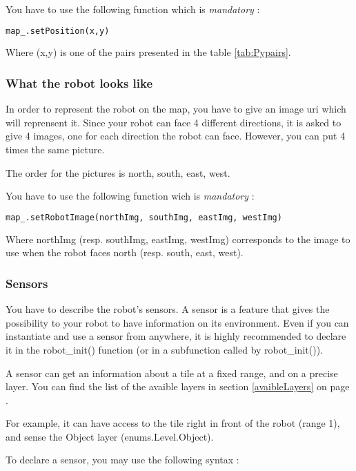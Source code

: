 \documentclass[a4paper,11pt]{article}
\begin{document}
You have to use the following function which is \emph{mandatory} :

\begin{lstlisting}[language=Python]
map_.setPosition(x,y)
\end{lstlisting}

Where (x,y) is one of the pairs presented in the table \ref{tab:Pypairs}.

\subsubsection{What the robot looks like}

In order to represent the robot on the map, you have to give an image
uri which will reprensent it. Since your robot can face 4 different
directions, it is asked to give 4 images, one for each direction the
robot can face. However, you can put 4 times the same picture.

The order for the pictures is north, south, east, west.

You have to use the following function wich is \emph{mandatory} :

\begin{lstlisting}[language=Python]
map_.setRobotImage(northImg, southImg, eastImg, westImg)
\end{lstlisting}

Where northImg (resp. southImg, eastImg, westImg) corresponds to the
image to use when the robot faces north (resp. south, east, west).

\subsubsection{Sensors}

You have to describe the robot's sensors. A sensor is a feature that
gives the possibility to your robot to have information on its
environment. Even if you can instantiate and use a sensor from
anywhere, it is highly recommended to declare it in the robot\_init()
function (or in a subfunction called by robot\_init()).

A sensor can get an information about a tile at a fixed range, and on
a precise layer. You can find the list of the avaible layers in
section \ref{avaibleLayers} on page \pageref{avaibleLayers}.

For example, it can have access to the tile right in front of the
robot (range 1), and sense the Object layer (enums.Level.Object).

To declare a sensor, you may use the following syntax :
\end{document}
